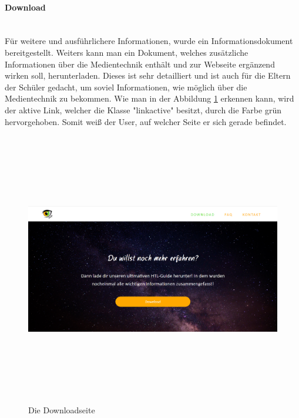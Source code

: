\paragraph{Download} \leavevmode \\
Für weitere und ausführlichere Informationen, wurde ein Informationsdokument bereitgestellt. Weiters kann man ein Dokument, welches zusätzliche Informationen über die Medientechnik enthält und zur Webseite ergänzend wirken soll, herunterladen. Dieses ist sehr detailliert und ist auch für die Eltern der Schüler gedacht, um soviel Informationen, wie möglich über die Medientechnik zu bekommen. Wie man in der Abbildung \ref{Abb6} erkennen kann, wird der aktive Link, welcher die Klasse "linkactive" besitzt, durch die Farbe grün hervorgehoben. Somit weiß der User, auf welcher Seite er sich gerade befindet.
\begin{figure}[h]
	\centering				\includegraphics[width=12cm,height=12cm,keepaspectratio]{webseite_abb6} 
	\caption{Die Downloadseite}
	\label{Abb6}
\end{figure}
